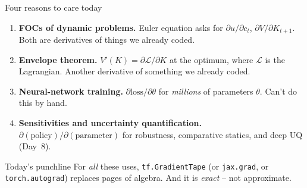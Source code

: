 \documentclass[aspectratio=169,11pt]{beamer}
\begin{document}
\begin{frame}{Four reasons to care today}
\small
\begin{enumerate}\itemsep5pt
\item \textbf{FOCs of dynamic problems.} Euler equation asks for $\partial u/\partial c_t$, $\partial V/\partial K_{t+1}$. Both are derivatives of things we already coded.
\item \textbf{Envelope theorem.} $V'(K) = \partial \mathcal{L}/\partial K$ at the optimum, where $\mathcal{L}$ is the Lagrangian. Another derivative of something we already coded.
\item \textbf{Neural-network training.} $\partial \mathrm{loss}/\partial \theta$ for \emph{millions} of parameters $\theta$. Can't do this by hand.
\item \textbf{Sensitivities and uncertainty quantification.} $\partial (\text{policy})/\partial (\text{parameter})$ for robustness, comparative statics, and deep UQ (Day~8).
\end{enumerate}
\vspace{4pt}
\begin{exampleblock}{Today's punchline}
\small For \emph{all} these uses, \texttt{tf.GradientTape} (or \texttt{jax.grad}, or \texttt{torch.autograd}) replaces pages of algebra. And it is \emph{exact} -- not approximate.
\end{exampleblock}
\end{frame}
\end{document}
